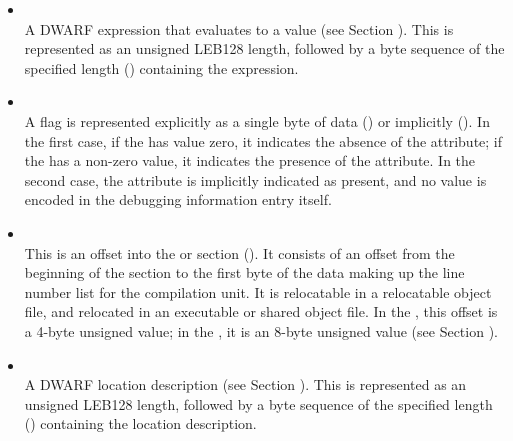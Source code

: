\begin{itemize}
\bb
\item \CLASSexprval \\
A DWARF expression that evaluates to a value 
(see Section ).
This is represented as an unsigned LEB128 length, 
followed by a byte sequence of the specified length (\DWFORMexprvalTARG)
containing the expression. 
\eb


\item \CLASSflag \\
A flag 
is represented explicitly as a single byte of data
(\DWFORMflagTARG) or implicitly (\DWFORMflagpresentTARG). In the
first case, if the  has value zero, it indicates the
absence of the attribute; if the  has a non-zero value,
it indicates the presence of the attribute. In the second
case, the attribute is implicitly indicated as present, and
no value is encoded in the debugging information entry itself.

\item \CLASSlineptr \\
This is an offset into 
the 
\dotdebugline{} or \dotdebuglinedwo{} section
(\DWFORMsecoffset).
It consists of an offset from the beginning of the 
\dotdebugline{}
section to the first byte of
the data making up the line number list for the compilation
unit. 
It is relocatable in a relocatable object file, and
relocated in an executable or shared object file. In the 
\thirtytwobitdwarfformat, this offset is a 4-byte unsigned value;
in the \sixtyfourbitdwarfformat, it is an 8-byte unsigned value
(see Section ).

\bb
\item \CLASSlocdesc \\
A DWARF location description 
(see Section ).
This is represented as an unsigned LEB128 length, 
followed by a byte sequence of the specified length (\DWFORMlocdescTARG)
containing the location description. 
\eb



\end{itemize}
